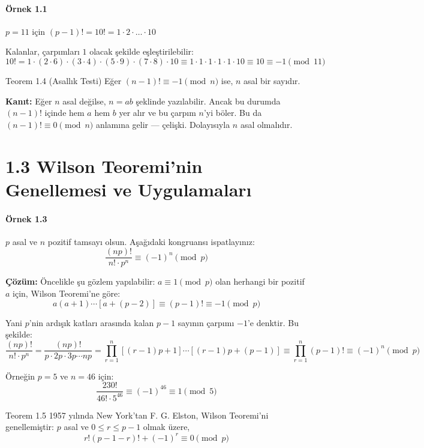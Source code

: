 \documentclass[12pt]{article}
\begin{document}
\paragraph{Örnek 1.1}  
$p = 11$ için $(p - 1)! = 10! = 1 \cdot 2 \cdot \dots \cdot 10$

Kalanlar, çarpımları $1$ olacak şekilde eşleştirilebilir:
\[
10! = 1 \cdot (2 \cdot 6) \cdot (3 \cdot 4) \cdot (5 \cdot 9) \cdot (7 \cdot 8) \cdot 10
\equiv 1 \cdot 1 \cdot 1 \cdot 1 \cdot 1 \cdot 10 \equiv 10 \equiv -1 \pmod{11}
\]

\pagebreak %
\begin{theorembox}{Teorem 1.4 (Asallık Testi)}
Eğer $(n - 1)! \equiv -1 \pmod{n}$ ise, $n$ asal bir sayıdır.

\textbf{Kanıt:}  
Eğer $n$ asal değilse, $n = ab$ şeklinde yazılabilir. Ancak bu durumda $(n - 1)!$ içinde hem $a$ hem $b$ yer alır ve bu çarpım $n$'yi böler. Bu da $(n - 1)! \equiv 0 \pmod{n}$ anlamına gelir — çelişki. Dolayısıyla $n$ asal olmalıdır.
\end{theorembox}

\section*{1.3 Wilson Teoremi'nin Genellemesi ve Uygulamaları}

\paragraph{Örnek 1.3}  
$p$ asal ve $n$ pozitif tamsayı olsun. Aşağıdaki kongruansı ispatlayınız:
\[
\frac{(np)!}{n! \cdot p^n} \equiv (-1)^n \pmod{p}
\]

\textbf{Çözüm:}  
Öncelikle şu gözlem yapılabilir: $a \equiv 1 \pmod{p}$ olan herhangi bir pozitif $a$ için, Wilson Teoremi'ne göre:
\[
a(a + 1) \cdots [a + (p - 2)] \equiv (p - 1)! \equiv -1 \pmod{p}
\]

Yani $p$'nin ardışık katları arasında kalan $p - 1$ sayının çarpımı $-1$'e denktir. Bu şekilde:
\[
\frac{(np)!}{n! \cdot p^n} = \frac{(np)!}{p \cdot 2p \cdot 3p \cdots np}
= \prod_{r=1}^{n} [(r-1)p + 1] \cdots [(r-1)p + (p-1)]
\equiv \prod_{r=1}^{n} (p - 1)! \equiv (-1)^n \pmod{p}
\]

Örneğin $p = 5$ ve $n = 46$ için:
\[
\frac{230!}{46! \cdot 5^{46}} \equiv (-1)^{46} \equiv 1 \pmod{5}
\]

\begin{theorembox}{Teorem 1.5}
1957 yılında New York'tan F. G. Elston, Wilson Teoremi'ni genellemiştir:  
$p$ asal ve $0 \leq r \leq p - 1$ olmak üzere,
\[
r!(p - 1 - r)! + (-1)^r \equiv 0 \pmod{p}
\]
\end{theorembox}
\end{document}
